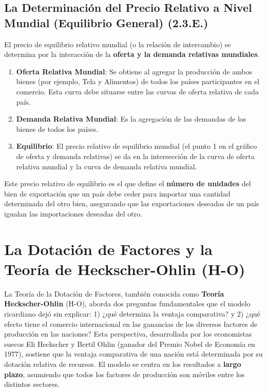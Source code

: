 \subsection{La Determinación del Precio Relativo a Nivel Mundial (Equilibrio General) (2.3.E.)}

El precio de equilibrio relativo mundial (o la relación de intercambio) se determina por la interacción de la \textbf{oferta y la demanda relativas mundiales}.

\begin{enumerate}
    \item \textbf{Oferta Relativa Mundial}: Se obtiene al agregar la producción de ambos bienes (por ejemplo, Tela y Alimentos) de todos los países participantes en el comercio. Esta curva debe situarse entre las curvas de oferta relativa de cada país.
    \item \textbf{Demanda Relativa Mundial}: Es la agregación de las demandas de los bienes de todos los países.
    \item \textbf{Equilibrio}: El precio relativo de equilibrio mundial (el punto 1 en el gráfico de oferta y demanda relativas) se da en la intersección de la curva de oferta relativa mundial y la curva de demanda relativa mundial.
\end{enumerate}

Este precio relativo de equilibrio es el que define el \textbf{número de unidades} del bien de exportación que un país debe ceder para importar una cantidad determinada del otro bien, asegurando que las exportaciones deseadas de un país igualan las importaciones deseadas del otro.


\section{La Dotación de Factores y la Teoría de Heckscher-Ohlin (H-O)}
La Teoría de la Dotación de Factores, también conocida como \textbf{Teoría Heckscher-Ohlin} (H-O), aborda dos preguntas fundamentales que el modelo ricardiano dejó sin explicar: 1) ¿qué determina la ventaja comparativa? y 2) ¿qué efecto tiene el comercio internacional en las ganancias de los diversos factores de producción en las naciones? Esta perspectiva, desarrollada por los economistas suecos Eli Heckscher y Bertil Ohlin (ganador del Premio Nobel de Economía en 1977), sostiene que la ventaja comparativa de una nación está determinada por su dotación relativa de recursos. El modelo se centra en los resultados a \textbf{largo plazo}, asumiendo que todos los factores de producción son móviles entre los distintos sectores.

